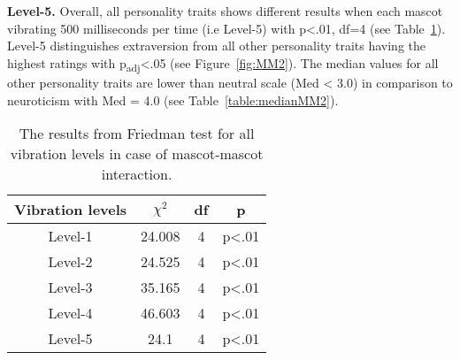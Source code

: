 \par\textbf{Level-5.}
Overall, all personality traits shows different results when each mascot vibrating 500 milliseconds
per time (i.e Level-5) with p<.01, df=4 (see Table~\ref{table:friedmanMM2}).
Level-5 distinguishes extraversion from all other personality traits having the
highest ratings with p\textsubscript{adj}<.05 (see Figure~\ref{fig:MM2}).
The median values for all other personality traits are lower than neutral scale (Med < 3.0)
in comparison to neuroticism with Med = 4.0 (see Table~\ref{table:medianMM2}).

\begin{table}[!htb]
    \renewcommand{\arraystretch}{1}
    \begin{center}
        \begin{tabular}{|c|c|c|c|}
            \hline
            \textbf{Vibration levels} & \textbf{$\chi^2$} & \textbf{df} & \textbf{p} \\
            \hline
            Level-1 &24.008 &4 &p<.01 \\
            \hline
            Level-2 &24.525 &4 &p<.01 \\
            \hline
            Level-3 &35.165 &4 &p<.01 \\
            \hline
            Level-4 &46.603 &4 &p<.01 \\
            \hline
            Level-5 &24.1 &4 &p<.01 \\
            \hline
        \end{tabular}
        \caption{The results from Friedman test for all vibration levels in case of mascot-mascot interaction.}
        \label{table:friedmanMM2}
    \end{center}
\end{table}

